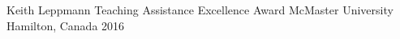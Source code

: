 



\begin{cvhonors}

  \cvhonor
    {Keith Leppmann Teaching Assistance Excellence Award} %
    {McMaster University} %
    {Hamilton, Canada} %
    {2016} %



\end{cvhonors}







